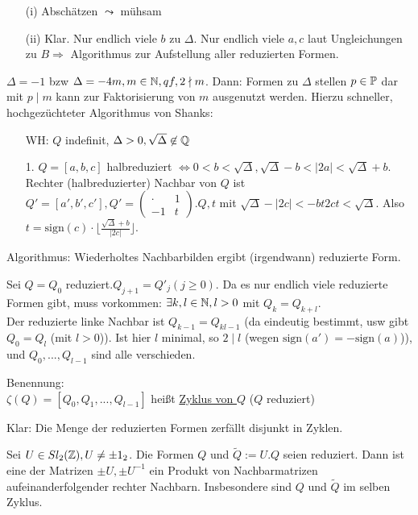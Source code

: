 \documentclass[a4paper,twoside,DIV15,BCOR12mm]{scrbook}
\begin{document}
\begin{beweis}
\begin{itemize}
\item[(i)] Abschätzen $\leadsto$ mühsam
\item[(ii)] Klar. Nur endlich viele $b$ zu $\Delta$. Nur endlich viele $a,c$ laut Ungleichungen zu $B \Rightarrow$ Algorithmus zur Aufstellung aller reduzierten Formen.
\end{itemize}
\end{beweis}

$\Delta = -1$ bzw $\Delta = -4m, m \in \mathbb{N}, qf, 2 \nmid m$. Dann: Formen zu $\Delta$ stellen $p \in \mathbb{P}$ dar mit $p \mid m$ kann zur Faktorisierung von $m$ ausgenutzt werden. Hierzu schneller, hochgezüchteter Algorithmus von Shanks:
\begin{itemize}
\item[WH:] $Q$ indefinit, $\Delta > 0, \sqrt{\Delta} \not\in \mathbb{Q}$
\item[1.] $Q = [a,b,c]$ halbreduziert $\Leftrightarrow 0 < b < \sqrt{\Delta}, \sqrt{\Delta} - b < |2a| < \sqrt{\Delta} + b$. Rechter (halbreduzierter) Nachbar von $Q$ ist $Q' = [a',b',c'], Q' = \begin{pmatrix}\cdot & 1\\-1 & t\end{pmatrix}.Q, t$ mit $\sqrt{\Delta} - |2c| < -bt2ct < \sqrt{\Delta}$. Also $t = \text{sign}(c)\cdot \lfloor \frac{\sqrt{\Delta} + b}{|2c|} \rfloor$.
\end{itemize}
Algorithmus: Wiederholtes Nachbarbilden ergibt (irgendwann) reduzierte Form. 

Sei $Q = Q_0$ reduziert.$Q_{j+1} = Q'_j (j \ge 0)$. Da es nur endlich viele reduzierte Formen gibt, muss vorkommen: $\exists k,l \in \mathbb{N}, l > 0$ mit $Q_k = Q_{k+l}$. \\
Der reduzierte linke Nachbar ist $Q_{k-1} = Q_{kl-1}$ (da eindeutig bestimmt, usw gibt $Q_0 = Q_l$ (mit $l > 0$)). Ist hier $l$ minimal, so $2 \mid l$ (wegen $\text{sign}(a') = -\text{sign}(a)$)), und $Q_0, ..., Q_{l-1}$ sind alle verschieden.

Benennung:\\
$\zeta(Q) = [Q_0, Q_1,...,Q_{l-1}]$ heißt \underline{Zyklus von $Q$} ($Q$ reduziert)

Klar: Die Menge der reduzierten Formen zerfällt disjunkt in Zyklen.

\begin{satz}
Sei $U \in Sl_2(\mathbb{Z}), U \not= \pm 1_2$. Die Formen $Q$ und $\tilde Q := U.Q$ seien reduziert. Dann ist eine der Matrizen $\pm U, \pm U^{-1}$ ein Produkt von Nachbarmatrizen aufeinanderfolgender rechter Nachbarn. Insbesondere sind $Q$ und $\tilde Q$ im selben Zyklus.
\end{satz}
\end{document}
